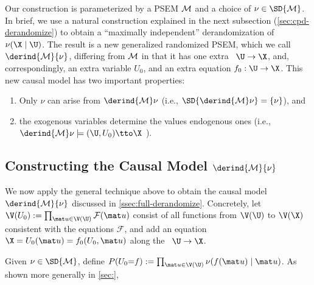 \begin{subappendices}
{Our construction is parameterized by a PSEM $\cal M$ and a choice of $\nu \in \SD{\mathcal M}$. In brief, we use a natural construction explained in the next subsection (\ref{sec:cpd-derandomize}) to obtain a ``maximally independent'' derandomization of $\nu(\X \mid \U)$.
The result is a new generalized randomized PSEM, which we call $\derind{\mathcal M}{\nu}$,
    differing from $\cal M$ in that it 
    has one extra \arc\ $\U \to \X$, and, correspondingly, an extra variable $U_0$, and an extra equation $f_0 : \U \to \X$.
This new causal model has two important properties: 
\begin{enumerate}
    \item 
    Only $\nu$ can arise from $\derind{\cal M}\nu$
    \hfill (i.e., $\SD{\derind{\cal M}\nu} = \{ \nu \}$), 
    and 
    \item 
    the exogenous variables determine the values endogenous ones
    \hfill(i.e.,
    $\derind{\cal M}\nu \models (\U,U_0) \tto \X$
    ). 
\end{enumerate}


\subsection*{Constructing the Causal Model $\derind{\cal M}{\nu}$}
We now apply the general technique above to obtain the causal model 
$\derind{\cal M}{\nu}$ discussed in \cref{ssec:full-derandomize}. 
%
Concretely, let 
$\V(U_0) := \prod_{\mat u \in \V(\U)} \mathcal F(\mat u)$
consist of all functions from $\V(\U)$ to $\V(\X)$ consistent with the equations $\mathcal F$,
and add an equation
$\X = U_0(\mat u) = f_{0}(U_0, \mat u)$
along the \arc\ $\U \to \X$.

Given $\nu \in \SD{\mathcal M}$,
define
$P(U_0 {=} f) := \prod_{\mat u \in \V(\U)} \nu(f(\mat u) \mid \mat u)$.
As shown more generally in \cref{sec:},

}
\end{subappendices}
